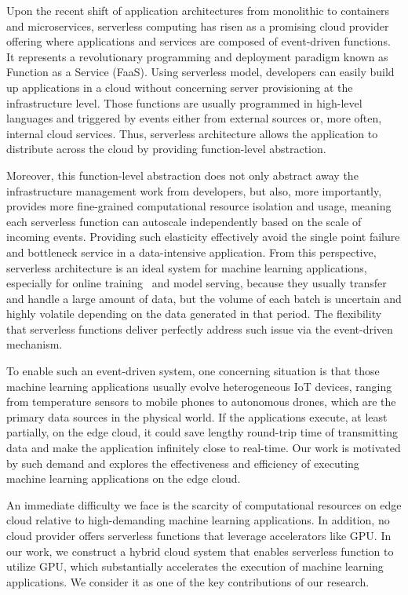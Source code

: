 Upon the recent shift of application architectures from monolithic to containers and microservices, serverless computing has risen as a promising cloud provider offering where applications and services are composed of event-driven functions. It represents a revolutionary programming and deployment paradigm known as Function as a Service (FaaS). Using serverless model, developers can easily build up applications in a cloud without concerning server provisioning at the infrastructure level. Those functions are usually programmed in high-level languages and triggered by events either from external sources or, more often, internal cloud services. Thus, serverless architecture allows the application to distribute across the cloud by providing function-level abstraction.

Moreover, this function-level abstraction does not only abstract away the infrastructure management work from developers, but also, more importantly, provides more fine-grained computational resource isolation and usage, meaning each serverless function can autoscale independently based on the scale of incoming events. Providing such elasticity effectively avoid the single point failure and bottleneck service in a data-intensive application. From this perspective, serverless architecture is an ideal system for machine learning applications, especially for online training~\cite{ref:online} and model serving, because they usually transfer and handle a large amount of data, but the volume of each batch is uncertain and highly volatile depending on the data generated in that period. The flexibility that serverless functions deliver perfectly address such issue via the event-driven mechanism. 

To enable such an event-driven system, one concerning situation is that those machine learning applications usually evolve heterogeneous IoT devices, ranging from temperature sensors to mobile phones to autonomous drones, which are the primary data sources in the physical world. If the applications execute, at least partially, on the edge cloud, it could save lengthy round-trip time of transmitting data and make the application infinitely close to real-time. Our work is motivated by such demand and explores the effectiveness and efficiency of executing machine learning applications on the edge cloud. 

An immediate difficulty we face is the scarcity of computational resources on edge cloud relative to high-demanding machine learning applications. In addition, no cloud provider offers serverless functions that leverage accelerators like GPU. In our work, we construct a hybrid cloud system that enables serverless function to utilize GPU, which substantially accelerates the execution of machine learning applications. We consider it as one of the key contributions of our research.

